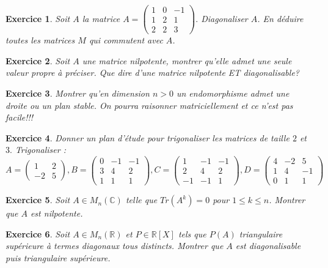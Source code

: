 \documentclass[12pt,a4paper]{article}
\newcommand{\R}{\mathbb{R}}
\newcommand{\C}{\mathbb{C}}
\theoremstyle{break}
\theoremstyle{break}
\newtheorem{Exo}{Exercice}
\begin{document}
\begin{Exo}
	Soit $A$ la matrice 
	$A=\left(\begin{array}{ccc}
		1&0&-1\\
		1&2&1\\
		2&2&3
	\end{array}\right).$
	 Diagonaliser $A$.
		 En déduire toutes les matrices $M$ qui commutent avec $A$.

\end{Exo}

\begin{Exo}
	Soit $A$ une matrice nilpotente, montrer qu'elle admet une seule valeur propre à préciser. Que dire d'une matrice nilpotente ET diagonalisable?
\end{Exo}


\begin{Exo}
	Montrer qu'en dimension $n>0$ un endomorphisme admet une droite ou un plan stable. On pourra raisonner matriciellement et ce n'est pas facile!!!
\end{Exo}

\begin{Exo}
	Donner un plan d'\'{e}tude pour trigonaliser les matrices de taille $2$
	et $3.$ Trigonaliser : 
	\[
	A=\left( 
	\begin{array}{cc}
		1 & 2 \\ 
		-2 & 5%
	\end{array}%
	\right) ,B=\left( 
	\begin{array}{ccc}
		0 & -1 & -1 \\ 
		3 & 4 & 2 \\ 
		1 & 1 & 1%
	\end{array}%
	\right) ,C=\left( 
	\begin{array}{ccc}
		1 & -1 & -1 \\ 
		2 & 4 & 2 \\ 
		-1 & -1 & 1%
	\end{array}%
	\right) ,D=\left( 
	\begin{array}{ccc}
		4 & -2 & 5 \\ 
		1 & 4 & -1 \\ 
		0 & 1 & 1%
	\end{array}%
	\right) 
	\]
\end{Exo}

\begin{Exo}
	Soit $A\in M_n(\C)$ telle que $Tr(A^k)=0$ pour $1\leqslant k\leqslant n$. Montrer que $A$ est nilpotente.
\end{Exo}

\begin{Exo}
	Soit $A\in M_{n}\left(\R\right) $ et $P\in \R\left[ X%
	\right] $ tels que $P\left( A\right) $ triangulaire sup\'{e}rieure \`{a}
	termes diagonaux tous distincts. Montrer que $A$ est diagonalisable puis
	triangulaire sup\'{e}rieure.
\end{Exo}
\end{document}
